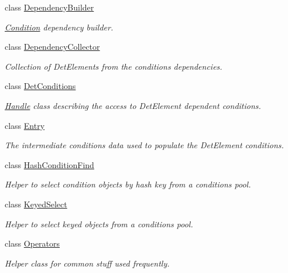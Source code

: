 \begin{DoxyCompactItemize}
class \hyperlink{class_d_d4hep_1_1_conditions_1_1_dependency_builder}{Dependency\+Builder}
\begin{DoxyCompactList}\small\item\em \hyperlink{class_d_d4hep_1_1_conditions_1_1_condition}{Condition} dependency builder. \end{DoxyCompactList}\item 
class \hyperlink{class_d_d4hep_1_1_conditions_1_1_dependency_collector}{Dependency\+Collector}
\begin{DoxyCompactList}\small\item\em Collection of Det\+Elements from the conditions dependencies. \end{DoxyCompactList}\item 
class \hyperlink{class_d_d4hep_1_1_conditions_1_1_det_conditions}{Det\+Conditions}
\begin{DoxyCompactList}\small\item\em \hyperlink{class_d_d4hep_1_1_handle}{Handle} class describing the access to Det\+Element dependent conditions. \end{DoxyCompactList}\item 
class \hyperlink{class_d_d4hep_1_1_conditions_1_1_entry}{Entry}
\begin{DoxyCompactList}\small\item\em The intermediate conditions data used to populate the Det\+Element conditions. \end{DoxyCompactList}\item 
class \hyperlink{class_d_d4hep_1_1_conditions_1_1_hash_condition_find}{Hash\+Condition\+Find}
\begin{DoxyCompactList}\small\item\em Helper to select condition objects by hash key from a conditions pool. \end{DoxyCompactList}\item 
class \hyperlink{class_d_d4hep_1_1_conditions_1_1_keyed_select}{Keyed\+Select}
\begin{DoxyCompactList}\small\item\em Helper to select keyed objects from a conditions pool. \end{DoxyCompactList}\item 
class \hyperlink{class_d_d4hep_1_1_conditions_1_1_operators}{Operators}
\begin{DoxyCompactList}\small\item\em Helper class for common stuff used frequently. \end{DoxyCompactList}\item 

\end{DoxyCompactItemize}
